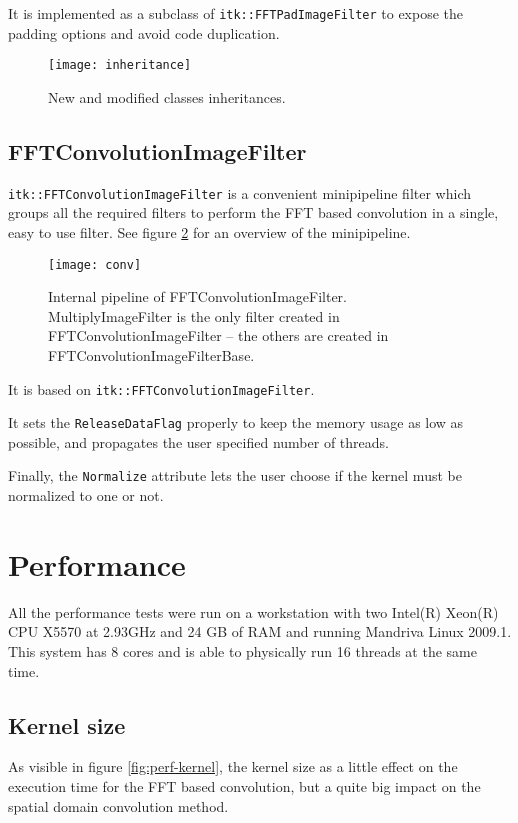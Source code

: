 \documentclass{InsightArticle}
\begin{document}
It is implemented as a subclass of \verb$itk::FFTPadImageFilter$ to expose the padding options and avoid
code duplication.

\begin{figure}[htbp]
\centering
\texttt{[image: inheritance]}
\caption{New and modified classes inheritances.\label{fig:conv-pipeline}}
\end{figure}

\subsection{FFTConvolutionImageFilter}

\verb$itk::FFTConvolutionImageFilter$ is a convenient minipipeline filter which groups all the required
filters to perform the FFT based convolution in a single, easy to use filter. See figure \ref{fig:conv-pipeline}
for an overview of the minipipeline.
\begin{figure}[htbp]
\centering
\texttt{[image: conv]}
\caption{Internal pipeline of FFTConvolutionImageFilter. MultiplyImageFilter is the only filter created in
FFTConvolutionImageFilter -- the others are created in FFTConvolutionImageFilterBase.\label{fig:conv-pipeline}}
\end{figure}

It is based on \verb$itk::FFTConvolutionImageFilter$.

It sets the \verb$ReleaseDataFlag$ properly to keep the memory usage as low as possible, and propagates the
user specified number of threads.

Finally, the \verb$Normalize$ attribute lets the user choose if the kernel must be normalized to one
or not.

\section{Performance}

All the performance tests were run on a workstation with two Intel(R) Xeon(R) CPU X5570 at 2.93GHz
and 24 GB of RAM and running Mandriva Linux 2009.1. This system has 8 cores and is able to physically
run 16 threads at the same time.

\subsection{Kernel size}

As visible in figure \ref{fig:perf-kernel}, the kernel size as a little effect on the execution time
for the FFT based convolution, but a quite big impact on the spatial domain convolution method.
\end{document}
